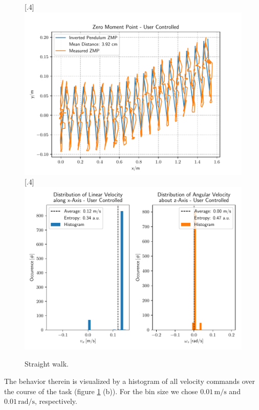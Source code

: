 \begin{figure}[h]
	\centering
	[.4\linewidth]{\includegraphics[scale=.35]{chapters/05_experiments/01_user_controlled_walking/02_test_environment/straight_walk_01_zmp.pdf}}
	[.4\linewidth]{\includegraphics[scale=.35]{chapters/05_experiments/01_user_controlled_walking/02_test_environment/straight_walk_01_entropy.pdf}}
	\caption{Straight walk.}
	\label{fig::512_uc_straight}
\end{figure} 
The behavior therein is visualized by a histogram of all velocity commands over the course of the task (figure \ref{fig::512_uc_straight} (b)). For the bin size we chose $0.01\,\text{m}/\text{s}$ and $0.01\,\text{rad}/\text{s}$, respectively. 
